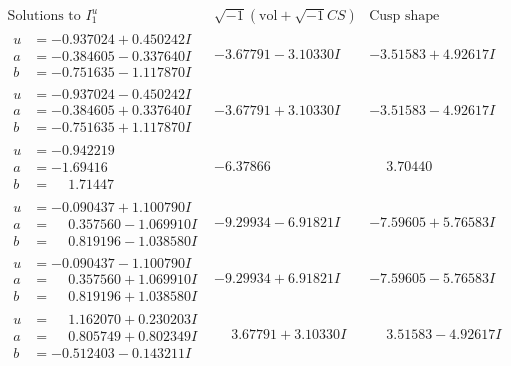 \documentclass[1p]{elsarticle_modified}
\theoremstyle{definition}
\newcommand{\I}{\sqrt{-1}}
\begin{document}
$$\begin{array}{c|c|c}  
\text{Solutions to }I^u_{1}& \I (\text{vol} + \sqrt{-1}CS) & \text{Cusp shape}\\
 \hline 
\begin{aligned}
u &= -0.937024 + 0.450242 I \\
a &= -0.384605 - 0.337640 I \\
b &= -0.751635 - 1.117870 I\end{aligned}
 & -3.67791 - 3.10330 I & -3.51583 + 4.92617 I \\ \hline\begin{aligned}
u &= -0.937024 - 0.450242 I \\
a &= -0.384605 + 0.337640 I \\
b &= -0.751635 + 1.117870 I\end{aligned}
 & -3.67791 + 3.10330 I & -3.51583 - 4.92617 I \\ \hline\begin{aligned}
u &= -0.942219\phantom{ +0.000000I} \\
a &= -1.69416\phantom{ +0.000000I} \\
b &= \phantom{-}1.71447\phantom{ +0.000000I}\end{aligned}
 & -6.37866\phantom{ +0.000000I} & \phantom{-}3.70440\phantom{ +0.000000I} \\ \hline\begin{aligned}
u &= -0.090437 + 1.100790 I \\
a &= \phantom{-}0.357560 - 1.069910 I \\
b &= \phantom{-}0.819196 - 1.038580 I\end{aligned}
 & -9.29934 - 6.91821 I & -7.59605 + 5.76583 I \\ \hline\begin{aligned}
u &= -0.090437 - 1.100790 I \\
a &= \phantom{-}0.357560 + 1.069910 I \\
b &= \phantom{-}0.819196 + 1.038580 I\end{aligned}
 & -9.29934 + 6.91821 I & -7.59605 - 5.76583 I \\ \hline\begin{aligned}
u &= \phantom{-}1.162070 + 0.230203 I \\
a &= \phantom{-}0.805749 + 0.802349 I \\
b &= -0.512403 - 0.143211 I\end{aligned}
 & \phantom{-}3.67791 + 3.10330 I & \phantom{-}3.51583 - 4.92617 I \\ \hline\begin{aligned}

\end{aligned}
\end{array}$$
\end{document}
